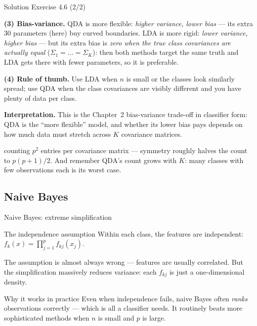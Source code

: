 \documentclass[aspectratio=169,11pt]{beamer}
\begin{document}
\begin{frame}{Solution \textemdash{} Exercise 4.6 (2/2)}
\begin{solutionbox}
\textbf{(3) Bias-variance.}
QDA is more flexible: \emph{higher variance, lower bias} --- its extra
$30$ parameters (here) buy curved boundaries. LDA is more
rigid: \emph{lower variance, higher bias} --- but its extra bias is
\emph{zero when the true class covariances are actually equal}
($\Sigma_1=\dots=\Sigma_K$): then both methods target the same truth
and LDA gets there with fewer parameters, so it is preferable.

\vspace{1mm}
\textbf{(4) Rule of thumb.}
Use LDA when $n$ is small or the classes look similarly spread; use QDA
when the class covariances are visibly different and you have plenty of
data per class.

\vspace{1mm}
\textbf{Interpretation.} This is the Chapter~2 bias-variance trade-off
in classifier form: QDA is the ``more flexible'' model, and whether its
lower bias pays depends on how much data must stretch across
$K$ covariance matrices.
\end{solutionbox}
\begin{mistake}
counting $p^2$ entries per covariance matrix ---
symmetry roughly halves the count to $p(p+1)/2$. And remember QDA's
count grows with $K$: many classes with few observations each is its
worst case.
\end{mistake}
\end{frame}

\subsection{Naive Bayes}

\begin{frame}{Naive Bayes: extreme simplification}
  \begin{block}{The independence assumption}
    Within each class, the features are independent:
    $f_k(x) = \prod_{j=1}^p f_{kj}(x_j)$.
  \end{block}
  \begin{takeaway}
    The assumption is almost always wrong --- features are usually
    correlated. But the simplification massively reduces variance:
    each $f_{kj}$ is just a one-dimensional density.
  \end{takeaway}
  \begin{exampleblock}{Why it works in practice}
    Even when independence fails, naive Bayes often \emph{ranks}
    observations correctly --- which is all a classifier needs. It
    routinely beats more sophisticated methods when $n$ is small and
    $p$ is large.
  \end{exampleblock}
\end{frame}
\end{document}
